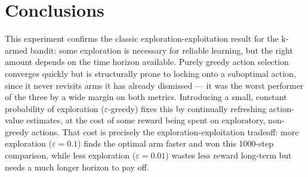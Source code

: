 \documentclass[11pt]{article}
\begin{document}
\section{Conclusions}
This experiment confirms the classic exploration-exploitation result for the k-armed bandit:
some exploration is necessary for reliable learning, but the right amount depends on the time
horizon available. Purely greedy action selection converges quickly but is structurally prone
to locking onto a suboptimal action, since it never revisits arms it has already dismissed ---
it was the worst performer of the three by a wide margin on both metrics. Introducing a small,
constant probability of exploration ($\varepsilon$-greedy) fixes this by continually
refreshing action-value estimates, at the cost of some reward being spent on exploratory,
non-greedy actions. That cost is precisely the exploration-exploitation tradeoff: more
exploration ($\varepsilon = 0.1$) finds the optimal arm faster and won this 1000-step
comparison, while less exploration ($\varepsilon = 0.01$) wastes less reward long-term but
needs a much longer horizon to pay off.
\end{document}
